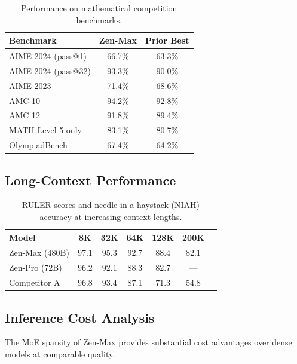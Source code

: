 \documentclass[11pt,a4paper]{article}
\begin{document}
\begin{table}[H]
\centering
\caption{Performance on mathematical competition benchmarks.}
\label{tab:math}
\begin{tabular}{lcc}
\toprule
\textbf{Benchmark} & \textbf{Zen-Max} & \textbf{Prior Best} \\
\midrule
AIME 2024 (pass@1)   & 66.7\% & 63.3\% \\
AIME 2024 (pass@32)  & 93.3\% & 90.0\% \\
AIME 2023            & 71.4\% & 68.6\% \\
AMC 10               & 94.2\% & 92.8\% \\
AMC 12               & 91.8\% & 89.4\% \\
MATH Level 5 only    & 83.1\% & 80.7\% \\
OlympiadBench        & 67.4\% & 64.2\% \\
\bottomrule
\end{tabular}
\end{table}

\subsection{Long-Context Performance}

\begin{table}[H]
\centering
\caption{RULER scores and needle-in-a-haystack (NIAH) accuracy at increasing context lengths.}
\label{tab:longctx}
\begin{tabular}{lcccccc}
\toprule
\textbf{Model} & \textbf{8K} & \textbf{32K} & \textbf{64K} & \textbf{128K} & \textbf{200K} \\
\midrule
Zen-Max (480B)     & 97.1 & 95.3 & 92.7 & 88.4 & 82.1 \\
Zen-Pro (72B)      & 96.2 & 92.1 & 88.3 & 82.7 & --- \\
Competitor A       & 96.8 & 93.4 & 87.1 & 71.3 & 54.8 \\
\bottomrule
\end{tabular}
\end{table}

\subsection{Inference Cost Analysis}

The MoE sparsity of Zen-Max provides substantial cost advantages over dense models at
comparable quality.
\end{document}

